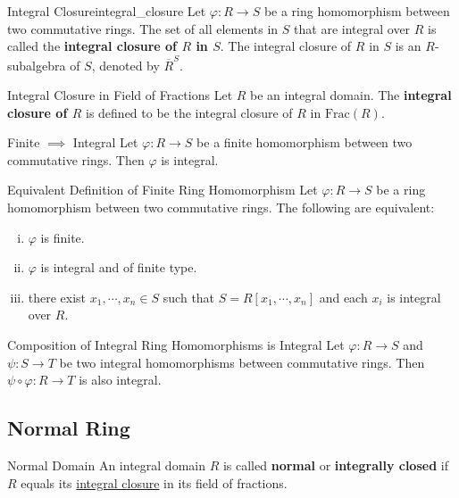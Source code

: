 \begin{definition}{Integral Closure}{integral_closure}
    Let $\varphi:R\to S$ be a ring homomorphism between two commutative rings. The set of all elements in $S$ that are integral over $R$ is called the \textbf{integral closure of $R$ in $S$}. The integral closure of $R$ in $S$ is an $R$-subalgebra of $S$, denoted by $\overline{R}^S$.
\end{definition}



\begin{definition}{Integral Closure in Field of Fractions}{}
    Let $R$ be an integral domain. The \textbf{integral closure of $R$} is defined to be the integral closure of $R$ in $\mathrm{Frac}(R)$.
\end{definition}



\begin{lemma}{Finite $\implies$ Integral}{}
    Let $\varphi:R\to S$ be a finite homomorphism between two commutative rings. Then $\varphi$ is integral.
\end{lemma}

\begin{proposition}{Equivalent Definition of Finite Ring Homomorphism}{}
    Let $\varphi:R\to S$ be a ring homomorphism between two commutative rings. The following are equivalent:
    \begin{enumerate}[(i)]
        \item $\varphi$ is finite.
        \item $\varphi$ is integral and of finite type.
        \item there exist $x_1,\cdots ,x_n\in S$ such that $S=R[x_1,\cdots ,x_n]$ and each $x_i$ is integral over $R$.
    \end{enumerate}
\end{proposition}


\begin{proposition}{Composition of Integral Ring Homomorphisms is Integral}{}
    Let $\varphi:R\to S$ and $\psi:S\to T$ be two integral homomorphisms between commutative rings. Then $\psi\circ\varphi:R\to T$ is also integral.
\end{proposition}

\subsection{Normal Ring}
\begin{definition}{Normal Domain}{}
    An integral domain $R$ is called \textbf{normal} or \textbf{integrally closed} if $R$ equals its \hyperref[th:integral_closure]{integral closure} in its field of fractions.
\end{definition}

